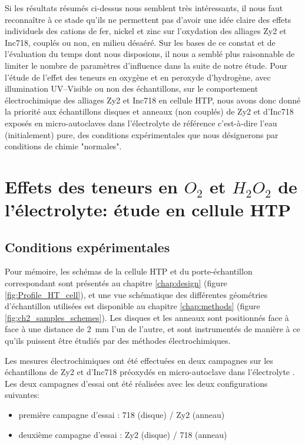 \begin{refsection}
    Si les résultats résumés ci-dessus nous semblent très intéressants, il nous faut reconnaître à ce stade qu’ils ne
    permettent pas d’avoir une idée claire des effets individuels des cations de fer, nickel et zinc sur l’oxydation des
    alliages Zy2 et Inc718, couplés ou non, en milieu désaéré. Sur les bases de ce constat et de l’évaluation du temps
    dont nous disposions, il nous a semblé plus raisonnable de limiter le nombre de paramètres d’influence dans la suite
    de notre étude. Pour l’étude de l’effet des teneurs en oxygène et en peroxyde d’hydrogène, avec illumination
    UV--Visible ou non des échantillons, sur le comportement électrochimique des alliages Zy2 et Inc718 en cellule HTP,
    nous avons donc donné la priorité aux échantillons disques et anneaux (non couplés) de Zy2 et d’Inc718 exposés en
    micro-autoclaves dans l’électrolyte de référence c’est-à-dire l’eau (initialement) pure, des conditions
    expérimentales que nous désignerons par conditions de chimie "normales".


    \section{Effets des teneurs en $O_2$ et $H_2O_2$ de l’électrolyte: étude en cellule HTP}\label{sec:ch4_oxygen_effect}

    \subsection{Conditions expérimentales}\label{subsec:ch4_exp_cond_oxygen}
    
    Pour mémoire, les schémas de la cellule HTP et du porte-échantillon correspondant sont présentés au chapitre
    \ref{chap:design} (figure \ref{fig:Profile_HT_cell}),
    et une vue schématique des différentes géométries d’échantillon utilisées est disponible au chapitre \ref{chap:methods} (figure
    \ref{fig:ch2_samples_schemes}). Les disques et les anneaux sont positionnés face à face à une distance de 2~mm l’un de l’autre, et sont
    instrumentés de manière à ce qu’ils puissent être étudiés par des méthodes électrochimiques. 


    Les mesures électrochimiques ont été effectuées en deux campagnes sur les échantillons de Zy2 et d’Inc718 préoxydés
    en micro-autoclave dans l’électrolyte \water . Les deux campagnes d’essai ont été réalisées avec les deux configurations
    suivantes:
    \begin{itemize}
        \item première campagne d’essai : 718 (disque) / Zy2 (anneau)
        \item deuxième campagne d’essai : Zy2 (disque) / 718 (anneau)
    \end{itemize}



\end{refsection}
